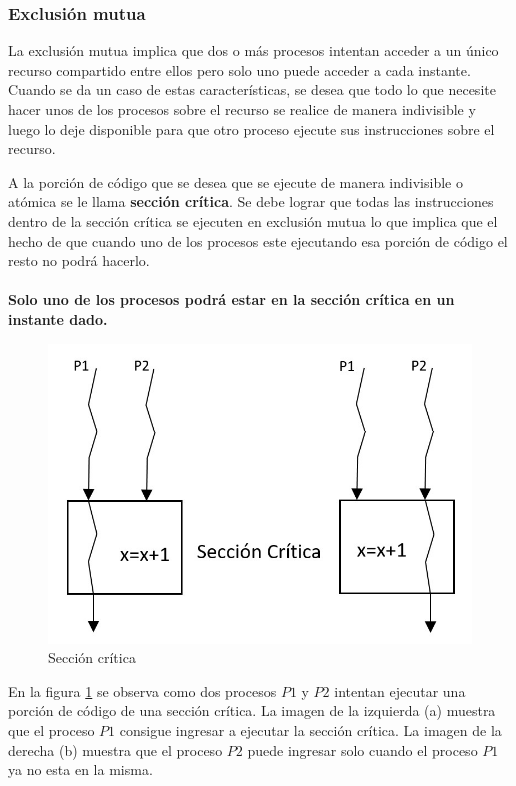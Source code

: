 \subsubsection{Exclusión mutua}
La exclusión mutua implica que dos o más procesos intentan acceder a un único recurso compartido entre ellos pero solo uno puede acceder a cada instante.
Cuando se da un caso de estas características, se desea que todo lo que necesite hacer unos de los procesos sobre el recurso se realice de manera indivisible y luego lo deje disponible para que otro proceso ejecute sus instrucciones sobre el recurso.
\par A la porción de código que se desea que se ejecute de manera indivisible o atómica se le llama \textbf{sección crítica}. Se debe lograr que todas las instrucciones dentro de la sección crítica se ejecuten en exclusión mutua lo que implica que el hecho de que cuando uno de los procesos este ejecutando esa porción de código el resto no podrá hacerlo. \\
\\
\textbf{Solo uno de los procesos podrá estar en la sección crítica en un instante dado.}

\begin{figure}[H]
    \centering
    \includegraphics[scale=0.4]{images/seccion_critica.jpg}
    \caption{Sección crítica}
    \label{fig:seccion_critica}
\end{figure}

En la figura \ref{fig:seccion_critica} se observa como dos procesos $P1$ y $P2$ intentan ejecutar una porción de código de una sección crítica. La imagen de la izquierda (a) muestra que el proceso $P1$ consigue ingresar a ejecutar la sección crítica. La imagen de la derecha (b) muestra que el proceso $P2$ puede ingresar solo cuando el proceso $P1$ ya no esta en la misma.

